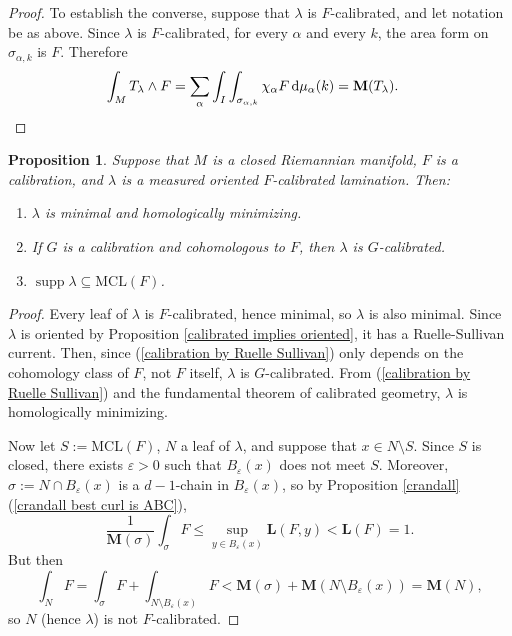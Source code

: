 \documentclass[reqno,11pt]{amsart}
\newcommand*\dif{\mathop{}\!\mathrm{d}}
\DeclareMathOperator{\supp}{supp}
\newcommand{\MCL}{\mathrm{MCL}}
\newcommand{\Mass}{\mathbf M}
\newcommand{\Comass}{\mathbf L}
\newtheorem{proposition}[theorem]{Proposition}
\theoremstyle{definition}
\numberwithin{equation}{section}
\begin{document}
\begin{proof}
To establish the converse, suppose that $\lambda$ is $F$-calibrated, and let notation be as above.
Since $\lambda$ is $F$-calibrated, for every $\alpha$ and every $k$, the area form on $\sigma_{\alpha, k}$ is $F$. Therefore
\begin{align*}
\int_M T_\lambda \wedge F &= \sum_\alpha \int_I \int_{\sigma_{\alpha, k}} \chi_\alpha F \dif \mu_\alpha(k) = \Mass(T_\lambda). \qedhere
\end{align*}
\end{proof}

\begin{proposition}\label{properties of calibrated laminations}
Suppose that $M$ is a closed Riemannian manifold, $F$ is a calibration, and $\lambda$ is a measured oriented $F$-calibrated lamination.
Then:
\begin{enumerate}
\item $\lambda$ is minimal and homologically minimizing.
\item If $G$ is a calibration and cohomologous to $F$, then $\lambda$ is $G$-calibrated.
\item $\supp \lambda \subseteq \MCL(F)$.
\end{enumerate}
\end{proposition}
\begin{proof}
Every leaf of $\lambda$ is $F$-calibrated, hence minimal, so $\lambda$ is also minimal.
Since $\lambda$ is oriented by Proposition \ref{calibrated implies oriented}, it has a Ruelle-Sullivan current.
Then, since (\ref{calibration by Ruelle Sullivan}) only depends on the cohomology class of $F$, not $F$ itself, $\lambda$ is $G$-calibrated.
From (\ref{calibration by Ruelle Sullivan}) and the fundamental theorem of calibrated geometry, $\lambda$ is homologically minimizing.

Now let $S := \MCL(F)$, $N$ a leaf of $\lambda$, and suppose that $x \in N \setminus S$.
Since $S$ is closed, there exists $\varepsilon > 0$ such that $B_\varepsilon(x)$ does not meet $S$.
Moreover, $\sigma := N \cap B_\varepsilon(x)$ is a $d-1$-chain in $B_\varepsilon(x)$, so by Proposition \ref{crandall}(\ref{crandall best curl is ABC}),
$$\frac{1}{\Mass(\sigma)} \int_\sigma F \leq \sup_{y \in B_\varepsilon(x)} \Comass(F, y) < \Comass(F) = 1.$$
But then 
$$\int_N F = \int_\sigma F + \int_{N \setminus B_\varepsilon(x)} F < \Mass(\sigma) + \Mass(N \setminus B_\varepsilon(x)) = \Mass(N),$$
so $N$ (hence $\lambda$) is not $F$-calibrated.
\end{proof}

\end{document}
